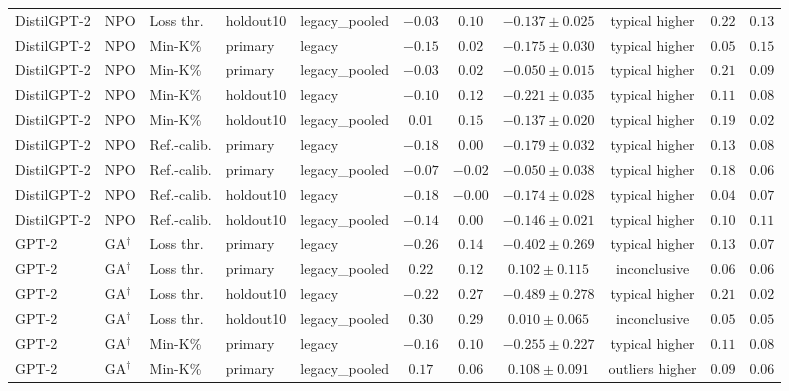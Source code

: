 \begin{table}[t]
\begin{tabular*}{\textwidth}{@{\extracolsep{\fill}}lllllcccccc@{}}
DistilGPT-2 & NPO & Loss thr. & holdout10 & legacy\_pooled & $-0.03$ & $0.10$ & $-0.137 \pm 0.025$ & typical higher & $0.22$ & $0.13$ \\
DistilGPT-2 & NPO & Min-K\% & primary & legacy & $-0.15$ & $0.02$ & $-0.175 \pm 0.030$ & typical higher & $0.05$ & $0.15$ \\
DistilGPT-2 & NPO & Min-K\% & primary & legacy\_pooled & $-0.03$ & $0.02$ & $-0.050 \pm 0.015$ & typical higher & $0.21$ & $0.09$ \\
DistilGPT-2 & NPO & Min-K\% & holdout10 & legacy & $-0.10$ & $0.12$ & $-0.221 \pm 0.035$ & typical higher & $0.11$ & $0.08$ \\
DistilGPT-2 & NPO & Min-K\% & holdout10 & legacy\_pooled & $0.01$ & $0.15$ & $-0.137 \pm 0.020$ & typical higher & $0.19$ & $0.02$ \\
DistilGPT-2 & NPO & Ref.-calib. & primary & legacy & $-0.18$ & $0.00$ & $-0.179 \pm 0.032$ & typical higher & $0.13$ & $0.08$ \\
DistilGPT-2 & NPO & Ref.-calib. & primary & legacy\_pooled & $-0.07$ & $-0.02$ & $-0.050 \pm 0.038$ & typical higher & $0.18$ & $0.06$ \\
DistilGPT-2 & NPO & Ref.-calib. & holdout10 & legacy & $-0.18$ & $-0.00$ & $-0.174 \pm 0.028$ & typical higher & $0.04$ & $0.07$ \\
DistilGPT-2 & NPO & Ref.-calib. & holdout10 & legacy\_pooled & $-0.14$ & $0.00$ & $-0.146 \pm 0.021$ & typical higher & $0.10$ & $0.11$ \\
GPT-2 & GA$^{\dagger}$ & Loss thr. & primary & legacy & $-0.26$ & $0.14$ & $-0.402 \pm 0.269$ & typical higher & $0.13$ & $0.07$ \\
GPT-2 & GA$^{\dagger}$ & Loss thr. & primary & legacy\_pooled & $0.22$ & $0.12$ & $0.102 \pm 0.115$ & inconclusive & $0.06$ & $0.06$ \\
GPT-2 & GA$^{\dagger}$ & Loss thr. & holdout10 & legacy & $-0.22$ & $0.27$ & $-0.489 \pm 0.278$ & typical higher & $0.21$ & $0.02$ \\
GPT-2 & GA$^{\dagger}$ & Loss thr. & holdout10 & legacy\_pooled & $0.30$ & $0.29$ & $0.010 \pm 0.065$ & inconclusive & $0.05$ & $0.05$ \\
GPT-2 & GA$^{\dagger}$ & Min-K\% & primary & legacy & $-0.16$ & $0.10$ & $-0.255 \pm 0.227$ & typical higher & $0.11$ & $0.08$ \\
GPT-2 & GA$^{\dagger}$ & Min-K\% & primary & legacy\_pooled & $0.17$ & $0.06$ & $0.108 \pm 0.091$ & outliers higher & $0.09$ & $0.06$ \\

\end{tabular*}
\end{table}
